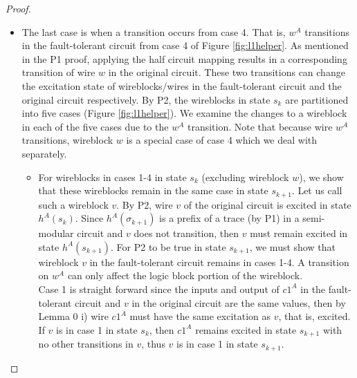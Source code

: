 \documentclass[12pt]{report}
\begin{document}
\begin{proof}
\begin{itemize}
\item The last case is when a transition occurs from case 4.  That is, $w^A$ transitions in the fault-tolerant circuit from case 4 of Figure \ref{fig:l1helper}.  %
As mentioned in the P1 proof, applying the half circuit mapping results in a corresponding transition of wire $w$ in the original circuit.  
These two transitions can change the excitation state of wireblocks/wires in the fault-tolerant circuit and the original circuit respectively.  By P2, the wireblocks in state $s_k$ are partitioned into five cases (Figure \ref{fig:l1helper}).  We examine the changes to a wireblock in each of the five cases due to the $w^A$ transition.  Note that because wire $w^A$ transitions, wireblock $w$ is a special case of case 4 which we deal with separately.
\begin{itemize}
\item
For wireblocks in cases 1-4 in state $s_k$ (excluding wireblock $w$), we show that these wireblocks remain in the same case in state $s_{k+1}$.  Let us call such a wireblock $v$.  By P2, wire $v$ of the original circuit is excited in state $h^A(s_{k})$.  Since $h^A(\sigma_{k+1})$ is a prefix of a trace (by P1) in a semi-modular circuit and $v$ does not transition, then $v$ must remain excited in state $h^A(s_{k+1})$.  For P2 to be true in state $s_{k+1}$, we must show that wireblock $v$ in the fault-tolerant circuit remains in cases 1-4.  A transition on $w^A$ can only affect the logic block portion of the wireblock.  \\
Case 1 is straight forward since the inputs and output of $c1^A$ in the fault-tolerant circuit and $v$ in the original circuit are the same values, then by Lemma 0 i) wire $c1^A$ must have the same excitation as $v$, that is, excited.  If $v$ is in case 1 in state $s_k$, then $c1^A$ remains excited in state $s_{k+1}$ with no other transitions in $v$, thus $v$ is in case 1 in state $s_{k+1}$.  \\

\end{itemize}
\end{itemize}
\end{proof}
\end{document}
